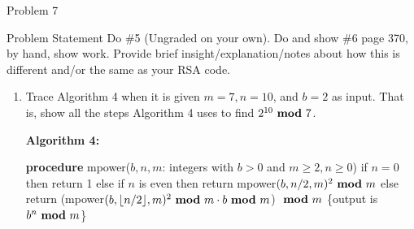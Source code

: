 \begin{problem}{Problem 7}
    \begin{statement}{Problem Statement}
        Do \#5 (Ungraded on your own). Do and show \#6 page 370, by hand, show work. Provide brief insight/explanation/notes about how this is different and/or the same as your RSA code.
    \end{statement}

    \begin{highlight}[Solution - \#6]
        \begin{enumerate}[label = \arabic*., start = 6]
            \item Trace Algorithm 4 when it is given $m = 7, n = 10$, and $b = 2$ as input. That is, show all the steps Algorithm 4 uses to find $2^{10} \text{ \textbf{mod} } 7$. \vspace*{1em}
            
            \noindent \textbf{Algorithm 4:} \vspace*{1em}

            \textbf{procedure} mpower($b, n, m$: integers with $b > 0$ and $m \geq 2, n \geq 0$) \newline
            if $n = 0$ then \newline
            \hspace*{10pt} return 1 \newline
            else if $n$ is even then \newline
            \hspace*{10pt} return mpower$(b,n/2,m)^{2} \text{ \textbf{mod} } m$ \newline
            else \newline
            \hspace*{10pt} return (mpower$(b,\lfloor n/2 \rfloor,m)^{2} \text{ \textbf{mod} } m \cdot b \text{ \textbf{mod} } m$) $\text{ \textbf{mod} } m$ \newline
            \{output is $b^{n} \text{ \textbf{mod} } m$\} \newline


\end{enumerate}
\end{highlight}
\end{problem}

